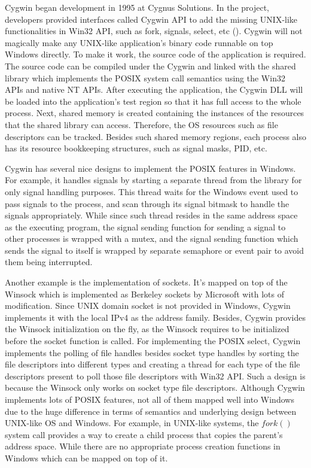 Cygwin began development in 1995 at Cygnus Solutions. In the project, developers provided interfaces called Cygwin API to add the missing UNIX-like functionalities in Win32 API, such as fork, signals, select, etc (\cite{Cygwin}). Cygwin will not magically make any UNIX-like application's binary code runnable on top  Windows directly. To make it work, the source code of the application is required. The source code can be compiled under the Cygwin and linked with the shared library which implements the POSIX system call semantics using the Win32 APIs and native NT APIs. After executing the application, the Cygwin DLL will be loaded into the application's test region so that it has full access to the whole process. Next, shared memory is created containing the instances of the resources that the shared library can access. Therefore, the OS resources such as file descriptors can be tracked. Besides such shared memory regions, each process also has its resource bookkeeping structures, such as signal masks, PID, etc.

Cygwin has several nice designs to implement the POSIX features in Windows. For example, it handles signals by starting a separate thread from the library for only signal handling purposes. This thread waits for the Windows event used to pass signals to the process, and scan through its signal bitmask to handle the signals appropriately. While since such thread resides in the same address space as the executing program, the signal sending function for sending a signal to other processes is wrapped with a mutex, and the signal sending function which sends the signal to itself is wrapped by separate semaphore or event pair to avoid them being interrupted. 

Another example is the implementation of sockets. It's mapped on top of the Winsock which is implemented as Berkeley sockets by Microsoft with lots of modification. Since UNIX domain socket is not provided in Windows, Cygwin implements it with the local IPv4 as the address family. Besides, Cygwin provides the Winsock initialization on the fly, as the Winsock requires to be initialized before the socket function is called. For implementing the POSIX select, Cygwin implements the polling of file handles besides socket type handles by sorting the file descriptors into different types and creating a thread for each type of the file descriptors present to poll those file descriptors with Win32 API. Such a design is because the Winsock only works on socket type file descriptors.              
Although Cygwin implements lots of POSIX features, not all of them mapped well into Windows due to the huge difference in terms of semantics and underlying design between UNIX-like OS and Windows. For example, in UNIX-like systems, the $fork()$ system call provides a way to create a child process that copies the parent's address space. While there are no appropriate process creation functions in Windows which can be mapped on top of it. 

